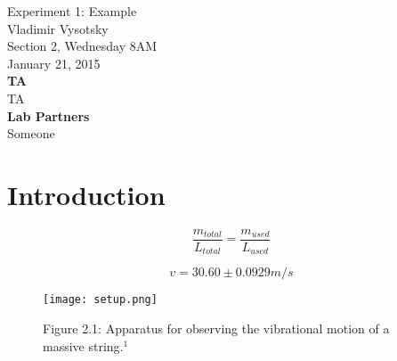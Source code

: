 \documentclass[journal]{IEEEtran}
\begin{document}
\newcommand{\labtitlepage}{
	\onecolumn
	\thispagestyle{empty} \vspace*{\fill}
	\begin{center}
		\LARGE\labtitle \\ \bigskip \bigskip \large\name \\ \bigskip
		\labsection \\ \bigskip \labdate \\ \bigskip \bigskip
		\textbf{TA} \\ \taname \\ \bigskip \textbf{Lab Partners} \\
		\partnername \\
	\end{center}
	\vspace*{\fill} \vspace*{\fill} \newpage
	\setcounter{page}{1}
	\twocolumn
}

\newcommand{\labtitle}{Experiment 1: Example}
\newcommand{\name}{Vladimir Vysotsky}
\newcommand{\labsection}{Section 2, Wednesday 8AM}
\newcommand{\labdate}{January 21, 2015}
\newcommand{\taname}{TA}
\newcommand{\partnername}{Someone}


\labtitlepage



\section{Introduction}

\begin{equation}
\label{proportions}
\frac{m_{total}}{L_{total}} = \frac{m_{used}}{L_{used}}
\end{equation}

\begin{displaymath}
v = 30.60 \pm 0.0929 m/s
\end{displaymath} 

\begin{figure}[ht!]
\centering
\texttt{[image: setup.png]}
\caption{Figure 2.1: Apparatus for observing the vibrational motion of a massive string.$^1$}
\label{setup}
\end{figure}
\end{document}
